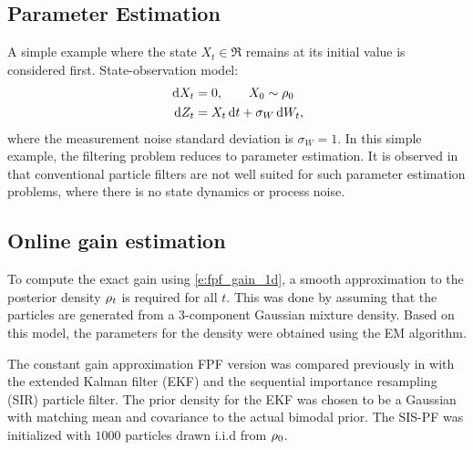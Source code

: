 \subsection{Parameter Estimation }
\label{s:param_estimation} 
A simple example where the state $X_t \in \Re$ remains at its initial value is considered first.
State-observation model:
\[
\begin{aligned}
\,\textmd{d} X_t&=0, \qquad X_0 \sim \rho_0\\
\,\textmd{d} Z_t&= X_t \,\textmd{d} t+\sigma_{W}\,\textmd{d} W_t,
\end{aligned}
\]
where the measurement noise standard deviation is $\sigma_{W} = 1$. 
In this simple example, the filtering problem reduces to parameter estimation. It is observed in \cite{arumasgorcla02} that conventional particle filters are not well suited for such parameter estimation problems, where there is no state dynamics or process noise.
%
\subsection*{Online gain estimation}
To compute the exact gain using \eqref{e:fpf_gain_1d}, a smooth approximation to the posterior density $\rho_t$ is required for all $t$. This was done by assuming that the particles are generated from a  3-component Gaussian mixture density. Based on this model, the parameters for the density were obtained using the EM algorithm.

The constant gain approximation FPF  version was compared previously in \cite{tilghiomeh13} with the extended Kalman filter (EKF) and the  sequential importance resampling (SIR) particle filter. The prior density for the EKF was chosen to be a Gaussian with matching mean and covariance to the actual bimodal prior. The SIS-PF was   initialized with $1000$ particles drawn i.i.d from $\rho_0$.

